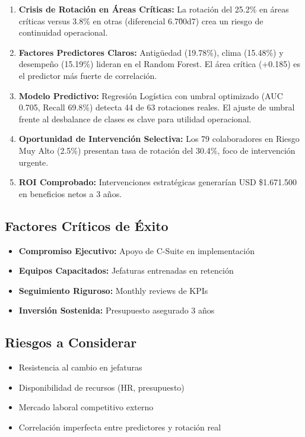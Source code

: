 \documentclass[11pt,a4paper,twoside]{article}
\begin{document}
\begin{enumerate}
    \item \textbf{Crisis de Rotación en Áreas Críticas:} La rotación del 25.2\% en áreas críticas versus 3.8\% en otras (diferencial 6.7\u00d7) crea un riesgo de continuidad operacional.
    
    \item \textbf{Factores Predictores Claros:} Antigüedad (19.78\%), clima (15.48\%) y desempeño (15.19\%) lideran en el Random Forest. El área crítica (+0.185) es el predictor más fuerte de correlación.
    
    \item \textbf{Modelo Predictivo:} Regresión Logística con umbral optimizado (AUC 0.705, Recall 69.8\%) detecta 44 de 63 rotaciones reales. El ajuste de umbral frente al desbalance de clases es clave para utilidad operacional.
    
    \item \textbf{Oportunidad de Intervención Selectiva:} Los 79 colaboradores en Riesgo Muy Alto (2.5\%) presentan tasa de rotación del 30.4\%, foco de intervención urgente.
    
    \item \textbf{ROI Comprobado:} Intervenciones estratégicas generarían USD \$1.671.500 en beneficios netos a 3 años.
\end{enumerate}

\subsection{Factores Críticos de Éxito}

\begin{itemize}
    \item \textbf{Compromiso Ejecutivo:} Apoyo de C-Suite en implementación
    \item \textbf{Equipos Capacitados:} Jefaturas entrenadas en retención
    \item \textbf{Seguimiento Riguroso:} Monthly reviews de KPIs
    \item \textbf{Inversión Sostenida:} Presupuesto asegurado 3 años
\end{itemize}

\subsection{Riesgos a Considerar}

\begin{itemize}
    \item Resistencia al cambio en jefaturas
    \item Disponibilidad de recursos (HR, presupuesto)
    \item Mercado laboral competitivo externo
    \item Correlación imperfecta entre predictores y rotación real
\end{itemize}
\end{document}
